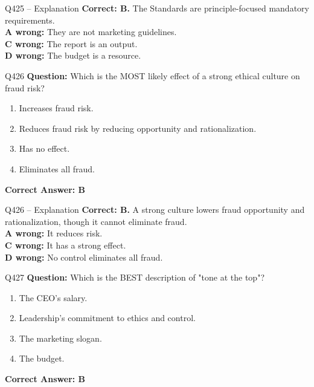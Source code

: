 \documentclass[aspectratio=169,10pt]{beamer}
\begin{document}
	\begin{frame}[t]{Q425 -- Explanation}
		\small
		\textbf{Correct: B.} The Standards are principle-focused mandatory requirements. \\[4pt]
		\textbf{A wrong:} They are not marketing guidelines. \\[2pt]
		\textbf{C wrong:} The report is an output. \\[2pt]
		\textbf{D wrong:} The budget is a resource.
	\end{frame}
	
	\begin{frame}[t]{Q426}
		\small
		\textbf{Question:} Which is the MOST likely effect of a strong ethical culture on fraud risk?
		\begin{enumerate}[label=\Alph*.,itemsep=1pt,topsep=2pt]
			\item Increases fraud risk.
			\item Reduces fraud risk by reducing opportunity and rationalization.
			\item Has no effect.
			\item Eliminates all fraud.
		\end{enumerate}
		\vspace{4pt}
		\textbf{Correct Answer: B}
	\end{frame}
	
	\begin{frame}[t]{Q426 -- Explanation}
		\small
		\textbf{Correct: B.} A strong culture lowers fraud opportunity and rationalization, though it cannot eliminate fraud. \\[4pt]
		\textbf{A wrong:} It reduces risk. \\[2pt]
		\textbf{C wrong:} It has a strong effect. \\[2pt]
		\textbf{D wrong:} No control eliminates all fraud.
	\end{frame}
	
	\begin{frame}[t]{Q427}
		\small
		\textbf{Question:} Which is the BEST description of "tone at the top"?
		\begin{enumerate}[label=\Alph*.,itemsep=1pt,topsep=2pt]
			\item The CEO's salary.
			\item Leadership's commitment to ethics and control.
			\item The marketing slogan.
			\item The budget.
		\end{enumerate}
		\vspace{4pt}
		\textbf{Correct Answer: B}
	\end{frame}
	
\end{document}
